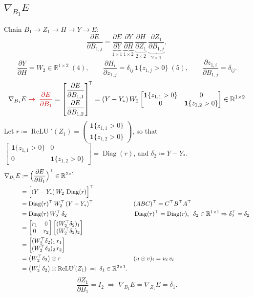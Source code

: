 \documentclass[11pt,a4paper]{article}
\newcommand{\R}{\mathbb{R}}
\newcommand{\ind}{\mathbf{1}}
\newcommand{\relu}{\operatorname{ReLU}}
\newcommand{\Diag}{\operatorname{Diag}}
\newcommand{\C}[1]{{\color{chg}#1}}          %
\newcommand{\fix}[2]{#1\;\C{\to\;#2}}         %
\begin{document}
\subsection{$\nabla_{B_1}E$}
Chain $B_1\to Z_1\to H\to Y\to E$:
\[
\frac{\partial E}{\partial B_{1,j}}
=\underbrace{\frac{\partial E}{\partial Y}}_{1\times1}\,
 \underbrace{\frac{\partial Y}{\partial H}}_{1\times2}\,
 \underbrace{\frac{\partial H}{\partial Z_1}}_{2\times2}\,
 \underbrace{\frac{\partial Z_1}{\partial B_{1,j}}}_{2\times1},
\]
\[
\frac{\partial Y}{\partial H}=W_2\in\R^{1\times2}\;(4),\qquad
\frac{\partial H_i}{\partial z_{1,j}}=\delta_{ij}\,\ind\{z_{1,j}>0\}\;(5),\qquad
\frac{\partial z_{1,i}}{\partial B_{1,j}}=\delta_{ij}.
\]
\[
\fix{\nabla_{B_1}E}{\dfrac{\partial E}{\partial B_1}}=\begin{bmatrix}\dfrac{\partial E}{\partial B_{1,1}}\\[8pt]\dfrac{\partial E}{\partial B_{1,2}}\end{bmatrix}^{\!\top}
=(Y-Y_*)\,W_2\begin{bmatrix}\ind\{z_{1,1}>0\}&0\\0&\ind\{z_{1,2}>0\}\end{bmatrix}\in\R^{1\times2}
\]
{\color{chg}
Let $r\coloneqq\relu'(Z_1)=\begin{pmatrix}\ind\{z_{1,1}>0\}\\\ind\{z_{1,2}>0\}\end{pmatrix}$, so that
$\begin{bmatrix}\ind\{z_{1,1}>0\}&0\\0&\ind\{z_{1,2}>0\}\end{bmatrix}=\Diag(r)$, and $\delta_2\coloneqq Y-Y_*$.
\begin{align*}
\nabla_{B_1}E
&\coloneqq\Bigl(\frac{\partial E}{\partial B_1}\Bigr)^{\top}\in\R^{2\times1}
&&\\
&=\Bigl[(Y-Y_*)\,W_2\,\Diag(r)\Bigr]^{\top}
&&\\
&=\Diag(r)^{\top}\,W_2^{\top}\,(Y-Y_*)^{\top}
&&(ABC)^{\top}=C^{\top}B^{\top}A^{\top}\\
&=\Diag(r)\,W_2^{\top}\,\delta_2
&&\Diag(r)^{\top}=\Diag(r),\;\;\delta_2\in\R^{1\times1}\Rightarrow\delta_2^{\top}=\delta_2\\
&=\begin{bmatrix}r_1&0\\0&r_2\end{bmatrix}
  \begin{bmatrix}(W_2^{\top}\delta_2)_1\\(W_2^{\top}\delta_2)_2\end{bmatrix}
&&\\
&=\begin{bmatrix}(W_2^{\top}\delta_2)_1\,r_1\\(W_2^{\top}\delta_2)_2\,r_2\end{bmatrix}
&&\\
&=\bigl(W_2^{\top}\delta_2\bigr)\odot r
&&(u\odot v)_i=u_i\,v_i\\
&=\bigl(W_2^{\top}\delta_2\bigr)\odot\relu'(Z_1)\;\eqqcolon\;\delta_1\in\R^{2\times1}.
&&
\end{align*}
\[
\frac{\partial Z_1}{\partial B_1}=I_2\;\Longrightarrow\;\nabla_{B_1}E=\nabla_{Z_1}E=\delta_1 .
\]
}
\end{document}
